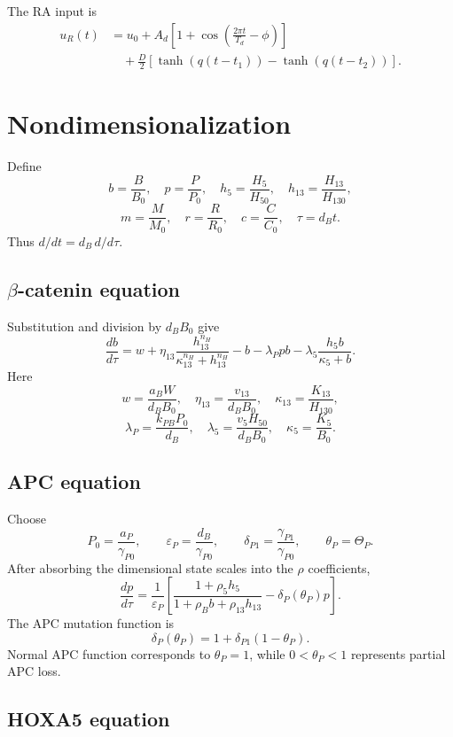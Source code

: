 \documentclass[11pt]{article}
\begin{document}
The RA input is
\begin{align}
u_R(t)
&=
u_0
+A_d\left[1+\cos\left(\frac{2\pi t}{T_d}-\phi\right)\right]
\nonumber\\
&\quad+
\frac{D}{2}\left[
\tanh(q(t-t_1))-\tanh(q(t-t_2))
\right].
\end{align}

\section{Nondimensionalization}

Define
\[
b=\frac{B}{B_0},\quad
p=\frac{P}{P_0},\quad
h_5=\frac{H_5}{H_{50}},\quad
h_{13}=\frac{H_{13}}{H_{130}},
\]
\[
m=\frac{M}{M_0},\quad
r=\frac{R}{R_0},\quad
c=\frac{C}{C_0},\quad
\tau=d_Bt.
\]
Thus \(d/dt=d_B\,d/d\tau\).

\subsection{\(\beta\)-catenin equation}

Substitution and division by \(d_BB_0\) give
\[
\boxed{
\frac{db}{d\tau}
=
w+\eta_{13}\frac{h_{13}^{n_H}}
{\kappa_{13}^{n_H}+h_{13}^{n_H}}
-b-\lambda_Ppb-\lambda_5\frac{h_5b}{\kappa_5+b}.
}
\]
Here
\[
w=\frac{a_BW}{d_BB_0},\quad
\eta_{13}=\frac{v_{13}}{d_BB_0},\quad
\kappa_{13}=\frac{K_{13}}{H_{130}},
\]
\[
\lambda_P=\frac{k_{PB}P_0}{d_B},\quad
\lambda_5=\frac{v_5H_{50}}{d_BB_0},\quad
\kappa_5=\frac{K_5}{B_0}.
\]

\subsection{APC equation}

Choose
\[
P_0=\frac{a_P}{\gamma_{P0}},\qquad
\varepsilon_P=\frac{d_B}{\gamma_{P0}},
\qquad
\delta_{P1}=\frac{\gamma_{P1}}{\gamma_{P0}},
\qquad
\theta_P=\Theta_P.
\]
After absorbing the dimensional state scales into the \(\rho\) coefficients,
\[
\boxed{
\frac{dp}{d\tau}
=
\frac{1}{\varepsilon_P}
\left[
\frac{1+\rho_5h_5}{1+\rho_Bb+\rho_{13}h_{13}}
-\delta_P(\theta_P)p
\right].
}
\]
The APC mutation function is
\[
\boxed{
\delta_P(\theta_P)=1+\delta_{P1}(1-\theta_P).
}
\]
Normal APC function corresponds to \(\theta_P=1\), while
\(0<\theta_P<1\) represents partial APC loss.

\subsection{HOXA5 equation}
\end{document}
